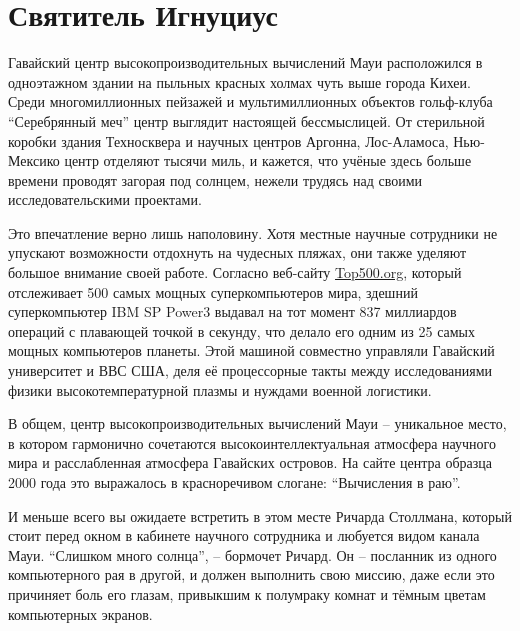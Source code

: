 
\chapter{Святитель Игнуциус}

Гавайский центр высокопроизводительных вычислений Мауи расположился в одноэтажном здании на пыльных красных холмах чуть выше города Кихеи. Среди многомиллионных пейзажей и мультимиллионных объектов гольф-клуба \enquote{Серебрянный меч} центр выглядит настоящей бессмыслицей. От стерильной коробки здания Техносквера и научных центров Аргонна, Лос-Аламоса, Нью-Мексико центр отделяют тысячи миль, и кажется, что учёные здесь больше времени проводят загорая под солнцем, нежели трудясь над своими исследовательскими проектами.

Это впечатление верно лишь наполовину. Хотя местные научные сотрудники не упускают возможности отдохнуть на чудесных пляжах, они также уделяют большое внимание своей работе. Согласно веб-сайту \url{Top500.org}, который отслеживает 500 самых мощных суперкомпьютеров мира, здешний суперкомпьютер IBM SP Power3 выдавал на тот момент 837 миллиардов операций с плавающей точкой в секунду, что делало его одним из 25 самых мощных компьютеров планеты. Этой машиной совместно управляли Гавайский университет и ВВС США, деля её процессорные такты между исследованиями физики высокотемпературной плазмы и нуждами военной логистики.

В общем, центр высокопроизводительных вычислений Мауи -- уникальное место, в котором гармонично сочетаются высокоинтеллектуальная атмосфера научного мира и расслабленная атмосфера Гавайских островов. На сайте центра образца 2000 года это выражалось в красноречивом слогане: \enquote{Вычисления в раю}.

И меньше всего вы ожидаете встретить в этом месте Ричарда Столлмана, который стоит перед окном в кабинете научного сотрудника и любуется видом канала Мауи. \enquote{Слишком много солнца}, -- бормочет Ричард. Он -- посланник из одного компьютерного рая в другой, и должен выполнить свою миссию, даже если это причиняет боль его глазам, привыкшим к полумраку комнат и тёмным цветам компьютерных экранов.

